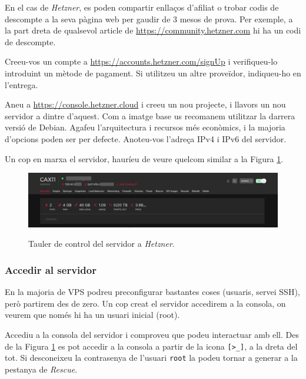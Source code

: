 \documentclass{practicaitic}
\begin{document}
En el cas de \textit{Hetzner}, es poden compartir enllaços d'afiliat o trobar
codis de descompte a la seva pàgina web per gaudir de 3 mesos de prova. Per
exemple, a la part dreta de qualsevol article de \url{https://community.hetzner.com} hi ha un
codi de descompte.

\begin{tasca}
Creeu-vos un compte a \url{https://accounts.hetzner.com/signUp} i
verifiqueu-lo introduint un mètode de pagament. Si utilitzeu un altre proveïdor,
indiqueu-ho en l'entrega.
\end{tasca}

\begin{previ}
Aneu a \url{https://console.hetzner.cloud} i creeu un nou projecte, i
llavors un nou servidor a dintre d'aquest. Com a imatge base us
recomanem utilitzar la darrera versió de Debian. Agafeu l'arquitectura i
recursos més econòmics, i la majoria d'opcions poden ser per defecte.
Anoteu-vos l'adreça IPv4 i IPv6 del servidor.
\end{previ}

Un cop en marxa el servidor, hauríeu de veure quelcom similar a la Figura \ref{fig:h1}.

\begin{figure}[h]
  \includegraphics[width=0.9\linewidth]{assets/hetzner1.png}
  \centering
  \label{fig:h1}
  \caption{Tauler de control del servidor a \textit{Hetzner}.}
\end{figure}

\subsubsection{Accedir al servidor}

En la majoria de VPS podreu preconfigurar bastantes coses (usuaris, servei SSH),
però partirem des de zero. Un cop creat el servidor accedirem a la consola,
on veurem que només hi ha un usuari inicial (root).

\begin{previ}
Accediu a la consola del servidor i comproveu que podeu interactuar amb
ell. Des de la Figura \ref{fig:h1} es pot accedir a la consola a partir de la
icona \verb|[>_]|, a la dreta del tot. Si desconeixeu la contrasenya de
l'usuari \verb|root| la podeu tornar a generar a la pestanya de \textit{Rescue}.
\end{previ}
\end{document}
